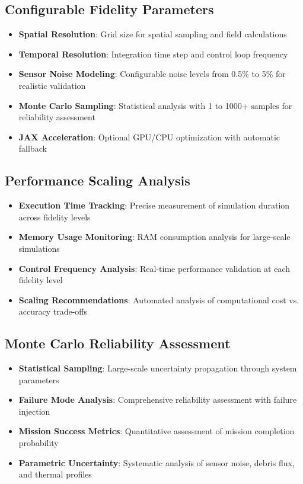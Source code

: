 \documentclass[11pt]{article}
\begin{document}
\subsection{Configurable Fidelity Parameters}
\begin{itemize}
\item \textbf{Spatial Resolution}: Grid size for spatial sampling and field calculations
\item \textbf{Temporal Resolution}: Integration time step and control loop frequency
\item \textbf{Sensor Noise Modeling}: Configurable noise levels from 0.5\% to 5\% for realistic validation
\item \textbf{Monte Carlo Sampling}: Statistical analysis with 1 to 1000+ samples for reliability assessment
\item \textbf{JAX Acceleration}: Optional GPU/CPU optimization with automatic fallback
\end{itemize}

\subsection{Performance Scaling Analysis}
\begin{itemize}
\item \textbf{Execution Time Tracking}: Precise measurement of simulation duration across fidelity levels
\item \textbf{Memory Usage Monitoring}: RAM consumption analysis for large-scale simulations
\item \textbf{Control Frequency Analysis}: Real-time performance validation at each fidelity level
\item \textbf{Scaling Recommendations}: Automated analysis of computational cost vs. accuracy trade-offs
\end{itemize}

\subsection{Monte Carlo Reliability Assessment}
\begin{itemize}
\item \textbf{Statistical Sampling}: Large-scale uncertainty propagation through system parameters
\item \textbf{Failure Mode Analysis}: Comprehensive reliability assessment with failure injection
\item \textbf{Mission Success Metrics}: Quantitative assessment of mission completion probability
\item \textbf{Parametric Uncertainty}: Systematic analysis of sensor noise, debris flux, and thermal profiles
\end{itemize}
\end{document}
